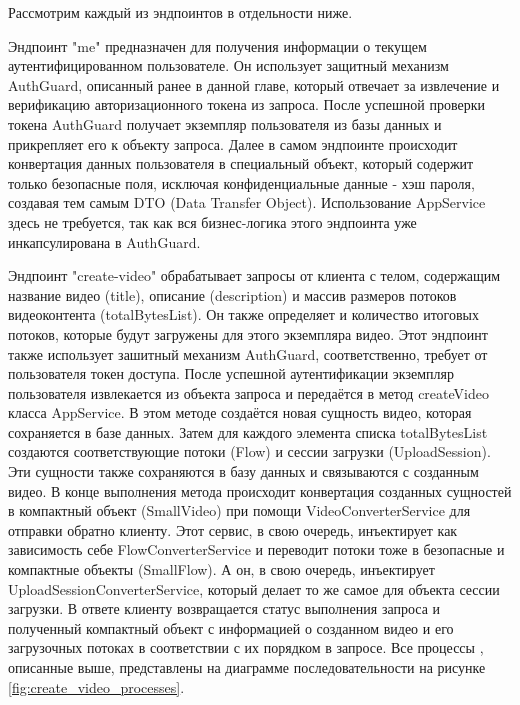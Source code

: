 	Рассмотрим каждый из эндпоинтов в отдельности ниже.

	Эндпоинт "me" предназначен для получения информации о текущем аутентифицированном пользователе. Он использует защитный механизм AuthGuard, описанный ранее в данной главе, который отвечает за извлечение и верификацию авторизационного токена из запроса. После успешной проверки токена AuthGuard получает экземпляр пользователя из базы данных и прикрепляет его к объекту запроса. Далее в самом эндпоинте происходит конвертация данных пользователя в специальный объект, который содержит только безопасные поля, исключая конфиденциальные данные - хэш пароля, создавая тем самым DTO (Data Transfer Object). Использование AppService здесь не требуется, так как вся бизнес-логика этого эндпоинта уже инкапсулирована в AuthGuard.

	Эндпоинт "create-video" обрабатывает запросы от клиента с телом, содержащим название видео (title), описание (description) и массив размеров потоков видеоконтента (totalBytesList). Он также определяет и количество итоговых потоков, которые будут загружены для этого экземпляра видео. Этот эндпоинт также использует зашитный механизм AuthGuard, соответственно, требует от пользователя токен доступа. После успешной аутентификации экземпляр пользователя извлекается из объекта запроса и передаётся в метод createVideo класса AppService. В этом методе создаётся новая сущность видео, которая сохраняется в базе данных. Затем для каждого элемента списка totalBytesList создаются соответствующие потоки (Flow) и сессии загрузки (UploadSession). Эти сущности также сохраняются в базу данных и связываются с созданным видео. В конце выполнения метода происходит конвертация созданных сущностей в компактный объект (SmallVideo) при помощи VideoConverterService для отправки обратно клиенту. Этот сервис, в свою очередь, инъектирует как зависимость себе FlowConverterService и переводит потоки тоже в безопасные и компактные объекты (SmallFlow). А он, в свою очередь, инъектирует UploadSessionConverterService, который делает то же самое для объекта сессии загрузки. В ответе клиенту возвращается статус выполнения запроса и полученный компактный объект с информацией о созданном видео и его загрузочных потоках в соответствии с их порядком в запросе. Все процессы , описанные выше, представлены на диаграмме последовательности на рисунке \ref{fig:create_video_processes}.

